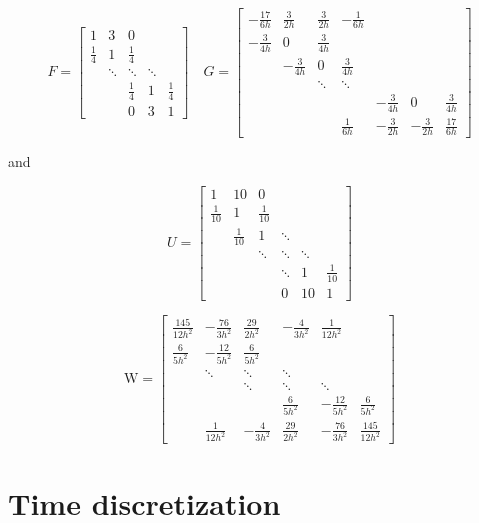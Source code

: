\documentclass[12pt]{article}
\begin{document}
$$
F=\left[\begin{array}{ccccc}
1 & 3 & 0 & & \\
\frac{1}{4} & 1 & \frac{1}{4} & & \\
& \ddots & \ddots & \ddots & \\
& & \frac{1}{4} & 1 & \frac{1}{4} \\
& & 0 & 3 & 1
\end{array}\right] \quad G=\left[\begin{array}{ccccccc}
-\frac{17}{6 h} & \frac{3}{2 h} & \frac{3}{2 h} & -\frac{1}{6 h} & & \\
-\frac{3}{4 h} & 0 & \frac{3}{4 h} & & & \\
& -\frac{3}{4 h} & 0 & \frac{3}{4 h} & & \\
& & \ddots & \ddots & & \\
&  & & & -\frac{3}{4 h} & 0 & \frac{3}{4 h} \\
 & & & \frac{1}{6 h} & -\frac{3}{2 h} & -\frac{3}{2 h} & \frac{17}{6 h}
\end{array}\right]
$$

and

$$
U=\left[\begin{array}{cccccc}
1 & 10 & 0 & & & \\
\frac{1}{10} & 1 & \frac{1}{10} & & & \\
& \frac{1}{10} & 1 & \ddots & & \\
& & \ddots & \ddots & \ddots & \\
& & & \ddots & 1 & \frac{1}{10} \\
& & & 0 & 10 & 1
\end{array}\right]
$$

$$
\mathrm{W}=\left[\begin{array}{cccccc}
\frac{145}{12 h^{2}} & -\frac{76}{3 h^{2}} & \frac{29}{2 h^{2}} & -\frac{4}{3 h^{2}} & \frac{1}{12 h^{2}} & \\
\frac{6}{5 h^{2}} & -\frac{12}{5 h^{2}} & \frac{6}{5 h^{2}} & & & \\
& \ddots & \ddots & \ddots & & \\
& & \ddots & \ddots & \ddots & \\
& & & \frac{6}{5 h^{2}} & -\frac{12}{5 h^{2}} & \frac{6}{5 h^{2}} \\
& \frac{1}{12 h^{2}} & -\frac{4}{3 h^{2}} & \frac{29}{2 h^{2}} & -\frac{76}{3 h^{2}} & \frac{145}{12 h^{2}}
\end{array}\right]
$$

\section{Time discretization}
\end{document}
